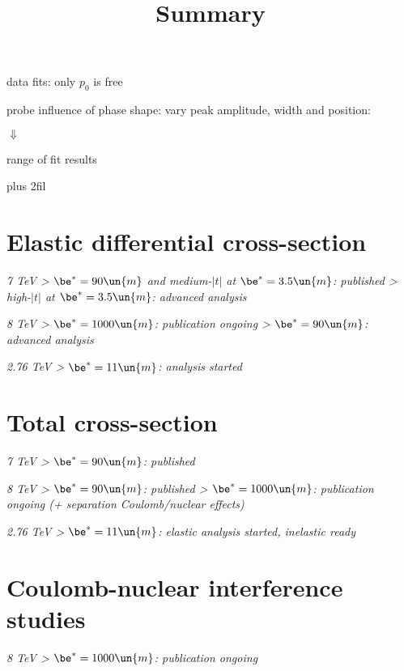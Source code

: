 \newpage %

\> data fits: only $p_0$ is free

\> probe influence of phase shape: vary peak amplitude, width and position:

\vskip2mm


\vfil

\centerline{$\Downarrow$}

\vfil

\centerline{range of fit results}

\vskip 0pt plus 2fil

\newpage %




\newpage %
\title{Summary}

{
\SmallerFonts

\section{Elastic differential cross-section}

\> \em{7 TeV}
\>> $\be^*=90\un{m}$ and medium-$|t|$ at $\be^{*}=3.5\un{m}$: published
\>> high-$|t|$ at $\be^{*}=3.5\un{m}$: advanced analysis

\> \em{8 TeV}
\>> $\be^*=1000\un{m}$: publication ongoing
\>> $\be^*=90\un{m}$: advanced analysis

\> \em{2.76 TeV}
\>> $\be^*=11\un{m}$: analysis started

\vfil
\section{Total cross-section}

\> \em{7 TeV}
\>> $\be^*=90\un{m}$: published

\> \em{8 TeV}
\>> $\be^*=90\un{m}$: published
\>> $\be^*=1000\un{m}$: publication ongoing (+ separation Coulomb/nuclear effects)

\> \em{2.76 TeV}
\>> $\be^*=11\un{m}$: elastic analysis started, inelastic ready

\vfil
\section{Coulomb-nuclear interference studies}

\> \em{8 TeV}
\>> $\be^*=1000\un{m}$: publication ongoing
}

